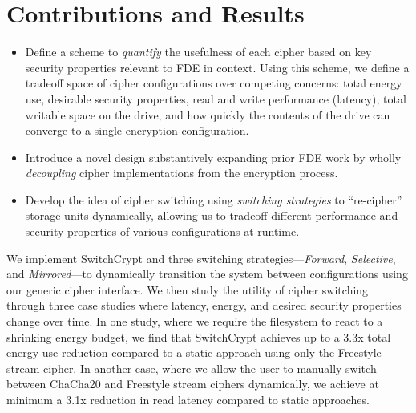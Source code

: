 \section{Contributions and Results}
\label{sec:key-contributions}

\begin{itemize}
  \item Define a scheme to \emph{quantify} the usefulness of each cipher based
  on key security properties relevant to FDE in context. Using this scheme, we
  define a tradeoff space of cipher configurations over competing concerns:
  total energy use, desirable security properties, read and write performance
  (latency), total writable space on the drive, and how quickly the contents of
  the drive can converge to a single encryption configuration.

  \item Introduce a novel design substantively expanding prior FDE work by
  wholly \emph{decoupling} cipher implementations from the encryption process.

  \item Develop the idea of cipher switching using \emph{switching strategies}
  to ``re-cipher'' storage units dynamically, allowing us to tradeoff different
  performance and security properties of various configurations at runtime.
\end{itemize}

We implement SwitchCrypt and three switching strategies---\emph{Forward},
\emph{Selective}, and \emph{Mirrored}---to dynamically transition the system
between configurations using our generic cipher interface. We then study the
utility of cipher switching through three case studies where latency, energy,
and desired security properties change over time. In one study, where we require
the filesystem to react to a shrinking energy budget, we find that SwitchCrypt
achieves up to a 3.3x total energy use reduction compared to a static approach
using only the Freestyle stream cipher. In another case, where we allow the user
to manually switch between ChaCha20 and Freestyle stream ciphers dynamically, we
achieve at minimum a 3.1x reduction in read latency compared to static
approaches.

\pagebreak





